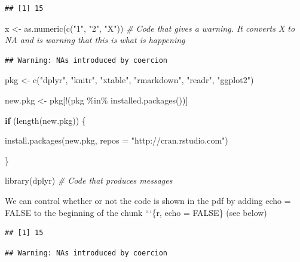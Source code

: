 \documentclass[
]{article}
\newenvironment{Shaded}{\begin{snugshade}}{\end{snugshade}}
\newcommand{\AttributeTok}[1]{\textcolor[rgb]{0.77,0.63,0.00}{#1}}
\newcommand{\CommentTok}[1]{\textcolor[rgb]{0.56,0.35,0.01}{\textit{#1}}}
\newcommand{\ControlFlowTok}[1]{\textcolor[rgb]{0.13,0.29,0.53}{\textbf{#1}}}
\newcommand{\FunctionTok}[1]{\textcolor[rgb]{0.00,0.00,0.00}{#1}}
\newcommand{\NormalTok}[1]{#1}
\newcommand{\OtherTok}[1]{\textcolor[rgb]{0.56,0.35,0.01}{#1}}
\newcommand{\SpecialCharTok}[1]{\textcolor[rgb]{0.00,0.00,0.00}{#1}}
\newcommand{\StringTok}[1]{\textcolor[rgb]{0.31,0.60,0.02}{#1}}
\begin{document}
\begin{verbatim}
## [1] 15
\end{verbatim}

\begin{Shaded}
\begin{Highlighting}[]
\NormalTok{x }\OtherTok{\textless{}{-}} \FunctionTok{as.numeric}\NormalTok{(}\FunctionTok{c}\NormalTok{(}\StringTok{"1"}\NormalTok{, }\StringTok{"2"}\NormalTok{, }\StringTok{"X"}\NormalTok{)) }\CommentTok{\# Code that gives a warning. It converts X to NA and is warning that this is what is happening}
\end{Highlighting}
\end{Shaded}

\begin{verbatim}
## Warning: NAs introduced by coercion
\end{verbatim}

\begin{Shaded}
\begin{Highlighting}[]
\NormalTok{pkg }\OtherTok{\textless{}{-}} \FunctionTok{c}\NormalTok{(}\StringTok{"dplyr"}\NormalTok{, }\StringTok{"knitr"}\NormalTok{, }\StringTok{"xtable"}\NormalTok{, }\StringTok{"rmarkdown"}\NormalTok{, }\StringTok{"readr"}\NormalTok{, }\StringTok{"ggplot2"}\NormalTok{)}

\NormalTok{new.pkg }\OtherTok{\textless{}{-}}\NormalTok{ pkg[}\SpecialCharTok{!}\NormalTok{(pkg }\SpecialCharTok{\%in\%} \FunctionTok{installed.packages}\NormalTok{())]}

\ControlFlowTok{if}\NormalTok{ (}\FunctionTok{length}\NormalTok{(new.pkg)) \{}

  \FunctionTok{install.packages}\NormalTok{(new.pkg, }\AttributeTok{repos =} \StringTok{"http://cran.rstudio.com"}\NormalTok{)}
  
\NormalTok{\}}

\FunctionTok{library}\NormalTok{(dplyr) }\CommentTok{\# Code that produces messages}
\end{Highlighting}
\end{Shaded}

We can control whether or not the code is shown in the pdf by adding
echo = FALSE to the beginning of the chunk ```\{r, echo = FALSE\} (see
below)

\begin{verbatim}
## [1] 15
\end{verbatim}

\begin{verbatim}
## Warning: NAs introduced by coercion
\end{verbatim}
\end{document}
